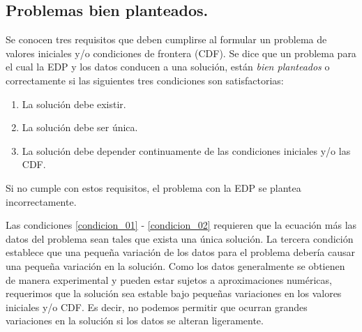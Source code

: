\subsection{Problemas bien planteados.}
Se conocen tres requisitos que deben cumplirse al formular un problema de valores iniciales y/o condiciones de frontera (CDF). Se dice que un problema para el cual la EDP y los datos conducen a una solución, están \emph{bien planteados} o correctamente si las siguientes tres condiciones son satisfactorias:
\begin{enumerate}[label=\roman*)]
\item La solución debe existir. \label{condicion_01}
\item La solución debe ser única. \label{condicion_02}
\item La solución debe depender continuamente de las condiciones iniciales y/o las CDF. \label{condicion_03}
\end{enumerate}
Si no cumple con estos requisitos, el problema con la EDP se plantea incorrectamente.
\par
Las condiciones \ref{condicion_01} - \ref{condicion_02} requieren que la ecuación más las datos del problema sean tales que exista una única solución. La tercera condición establece que una pequeña variación de los datos para el problema debería causar una pequeña variación en la solución. Como los datos generalmente se obtienen de manera experimental y pueden estar sujetos a aproximaciones numéricas, requerimos que la solución sea estable bajo pequeñas variaciones en los valores iniciales y/o CDF. Es decir, no podemos permitir que ocurran grandes variaciones en la solución si los datos se alteran ligeramente.
